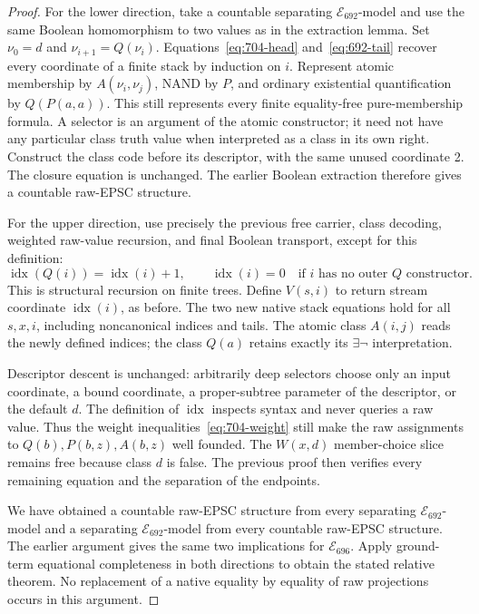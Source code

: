 \begin{proof}
For the lower direction, take a countable separating
$\mathcal E_{692}$-model and use the same Boolean homomorphism to
two values as in the extraction lemma.  Set
$\nu_0=d$ and $\nu_{i+1}=Q(\nu_i)$.
Equations~\eqref{eq:704-head} and~\eqref{eq:692-tail} recover every
coordinate of a finite stack by induction on $i$.  Represent atomic
membership by $A(\nu_i,\nu_j)$, NAND by $P$, and ordinary existential
quantification by $Q(P(a,a))$.  This still represents every finite
equality-free pure-membership formula.  A selector is an argument of
the atomic constructor; it need not have any particular class truth
value when interpreted as a class in its own right.
Construct the class code before its descriptor, with the same unused
coordinate 2.  The closure equation is unchanged.  The earlier
Boolean extraction therefore gives a countable raw-EPSC structure.

For the upper direction, use precisely the previous free carrier,
class decoding, weighted raw-value recursion, and final Boolean
transport, except for this definition:
\[
 \operatorname{idx}(Q(i))=\operatorname{idx}(i)+1,\qquad
 \operatorname{idx}(i)=0
       \quad\text{if $i$ has no outer $Q$ constructor}.
\]
This is structural recursion on finite trees.  Define $V(s,i)$
to return stream coordinate $\operatorname{idx}(i)$, as before.
The two new native stack equations hold for all $s,x,i$, including
noncanonical indices and tails.  The atomic class $A(i,j)$ reads
the newly defined indices; the class $Q(a)$ retains exactly its
$\exists\neg$ interpretation.

Descriptor descent is unchanged: arbitrarily deep selectors choose
only an input coordinate, a bound coordinate, a proper-subtree
parameter of the descriptor, or the default $d$.  The definition of
$\operatorname{idx}$ inspects syntax and never queries a raw value.
Thus the weight inequalities~\eqref{eq:704-weight} still make the
raw assignments to $Q(b),P(b,z),A(b,z)$ well founded.  The
$W(x,d)$ member-choice slice remains free because class $d$ is false.
The previous proof then verifies every remaining equation and the
separation of the endpoints.

We have obtained a countable raw-EPSC structure from every separating
$\mathcal E_{692}$-model and a separating $\mathcal E_{692}$-model
from every countable raw-EPSC structure.  The earlier argument gives
the same two implications for $\mathcal E_{696}$.  Apply ground-term
equational completeness in both directions to obtain the stated
relative theorem.  No replacement of a native equality by equality
of raw projections occurs in this argument.
\end{proof}

